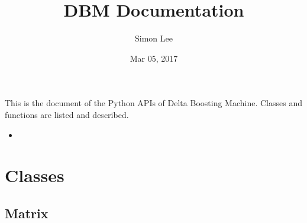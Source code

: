 \documentclass[letterpaper,10pt,english]{sphinxmanual}
\title{DBM Documentation}
\date{Mar 05, 2017}
\author{Simon Lee}
\begin{document}
\maketitle
\sphinxtableofcontents
{}\label{\detokenize{index::doc}}


This is the document of the Python APIs of Delta Boosting Machine. Classes and functions are listed and described.
\begin{itemize}
\item {} 

\end{itemize}


\chapter{Classes}
\label{\detokenize{index:welcome-to-dbm-s-documentation}}\label{\detokenize{index:classes}}

\section{Matrix}
\label{\detokenize{index:matrix}}
\end{document}
